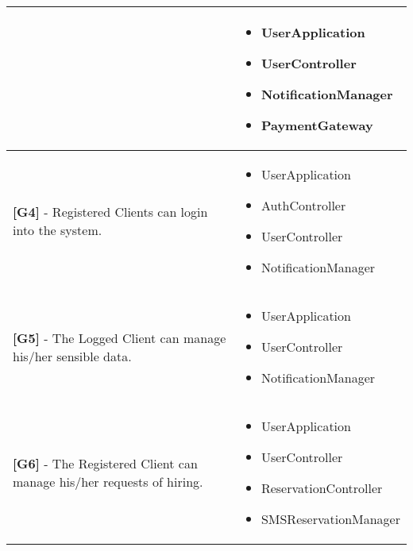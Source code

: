 \begin{longtable}{|l|l|}
\begin{minipage}[t]{0.5\textwidth}
\end{minipage} &
\begin{minipage}[t]{0.45\textwidth}
\begin{itemize}
\item UserApplication
\item UserController
\item NotificationManager
\item PaymentGateway
\end{itemize}
\end{minipage} \\ \hline
\begin{minipage}[t]{0.5\textwidth}
\textbf{[G4]} - Registered Clients can login into the system.
\end{minipage} &
\begin{minipage}[t]{0.45\textwidth}
\begin{itemize}
\item UserApplication
\item AuthController
\item UserController
\item NotificationManager
\end{itemize}
\end{minipage} \\ \hline
\begin{minipage}[t]{0.5\textwidth}
\textbf{[G5]} - The Logged Client can manage his/her sensible data.
\end{minipage} &
\begin{minipage}[t]{0.45\textwidth}
\begin{itemize}
\item UserApplication
\item UserController
\item NotificationManager
\end{itemize}
\end{minipage} \\ \hline
\begin{minipage}[t]{0.5\textwidth}
\textbf{[G6]} - The Registered Client can manage his/her requests of hiring.
\end{minipage} &
\begin{minipage}[t]{0.45\textwidth}
\begin{itemize}
\item UserApplication
\item UserController
\item ReservationController
\item SMSReservationManager

\end{itemize}
\end{minipage}
\end{longtable}
